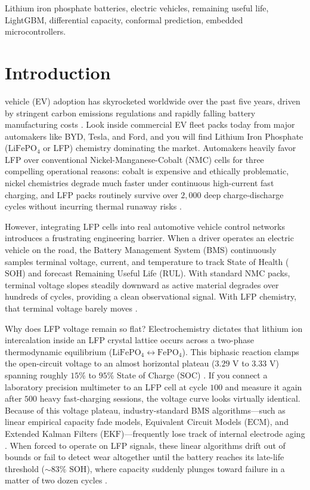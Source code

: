 \documentclass[journal,10pt]{IEEEtran}
\begin{document}
\begin{IEEEkeywords}
Lithium iron phosphate batteries, electric vehicles, remaining useful life, LightGBM, differential capacity, conformal prediction, embedded microcontrollers.
\end{IEEEkeywords}

\section{Introduction}

 vehicle (EV) adoption has skyrocketed worldwide over the past five years, driven by stringent carbon emissions regulations and rapidly falling battery manufacturing costs \cite{feng2020thermal, roman2021machine}. Look inside commercial EV fleet packs today from major automakers like BYD, Tesla, and Ford, and you will find Lithium Iron Phosphate ($\text{LiFePO}_4$ or LFP) chemistry dominating the market. Automakers heavily favor LFP over conventional Nickel-Manganese-Cobalt (NMC) cells for three compelling operational reasons: cobalt is expensive and ethically problematic, nickel chemistries degrade much faster under continuous high-current fast charging, and LFP packs routinely survive over $2,000$ deep charge-discharge cycles without incurring thermal runaway risks \cite{severson2019data, theiler2022differential}. 

However, integrating LFP cells into real automotive vehicle control networks introduces a frustrating engineering barrier. When a driver operates an electric vehicle on the road, the Battery Management System (BMS) continuously samples terminal voltage, current, and temperature to track State of Health ($\text{SOH}$) and forecast Remaining Useful Life ($\text{RUL}$). With standard NMC packs, terminal voltage slopes steadily downward as active material degrades over hundreds of cycles, providing a clean observational signal. With LFP chemistry, that terminal voltage barely moves \cite{zhang2022real, wu2023online}.

Why does LFP voltage remain so flat? Electrochemistry dictates that lithium ion intercalation inside an LFP crystal lattice occurs across a two-phase thermodynamic equilibrium ($\text{LiFePO}_4 \leftrightarrow \text{FePO}_4$). This biphasic reaction clamps the open-circuit voltage to an almost horizontal plateau ($3.29\text{ V}$ to $3.33\text{ V}$) spanning roughly $15\%$ to $95\%$ State of Charge ($\text{SOC}$) \cite{theiler2022differential}. If you connect a laboratory precision multimeter to an LFP cell at cycle $100$ and measure it again after $500$ heavy fast-charging sessions, the voltage curve looks virtually identical. Because of this voltage plateau, industry-standard BMS algorithms—such as linear empirical capacity fade models, Equivalent Circuit Models ($\text{ECM}$), and Extended Kalman Filters ($\text{EKF}$)—frequently lose track of internal electrode aging \cite{plett2004extended, berecibar2016critical}. When forced to operate on LFP signals, these linear algorithms drift out of bounds or fail to detect wear altogether until the battery reaches its late-life threshold ($\sim 83\%\text{ SOH}$), where capacity suddenly plunges toward failure in a matter of two dozen cycles \cite{severson2019data}.
\end{document}
